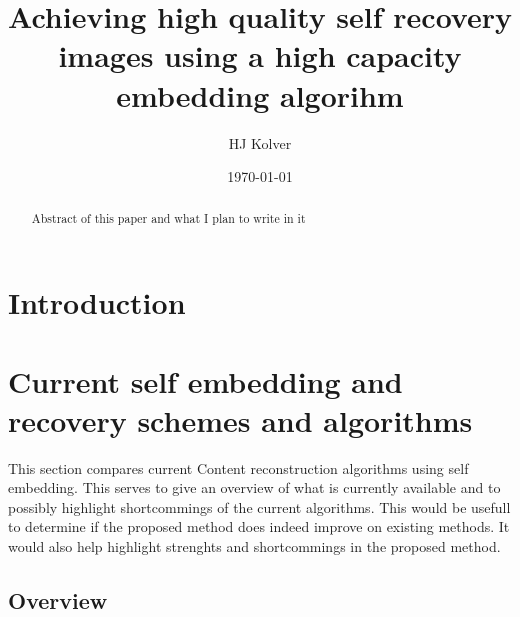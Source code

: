 \documentclass[a4paper]{article}
\title{Achieving high quality self recovery images using a high capacity embedding algorihm}
\author{HJ Kolver}
\date{\today}
\begin{document}
\maketitle

\begin{abstract}
Abstract of this paper and what I plan to write in it
\end{abstract}

\section{Introduction}

\section{Current self embedding and recovery schemes and algorithms}

This section compares current Content reconstruction algorithms using self embedding.
This serves to give an overview of what is currently available and to possibly highlight shortcommings of the current algorithms.
This would be usefull to determine if the proposed method does indeed improve on existing methods. 
It would also help highlight strenghts and shortcommings in the proposed method.

\subsection{Overview}
\end{document}

